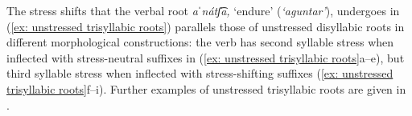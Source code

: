     \z
\z

The stress shifts that the verbal root \textit{aˈnátʃ͡a,} ‘endure’ (\textit{‘aguntar’}), undergoes in (\ref{ex: unstressed trisyllabic roots}) parallels those of unstressed disyllabic roots in different morphological constructions: the verb has second syllable stress when inflected with stress-neutral suffixes in (\ref{ex: unstressed trisyllabic roots}a--e), but third syllable stress when inflected with stress-shifting suffixes (\ref{ex: unstressed trisyllabic roots}f--i). Further examples of unstressed trisyllabic roots are given in .

